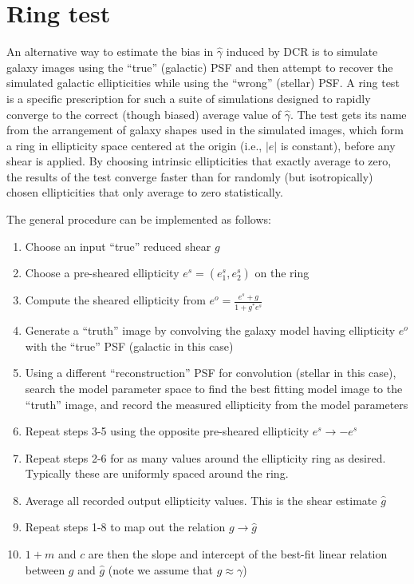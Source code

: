 \documentclass[apj]{emulateapj}
\begin{document}
\section{Ring test}\label{sec:ringtest}
An alternative way to estimate the bias in $\hat{\gamma}$ induced by
DCR is to simulate galaxy images using the ``true'' (galactic) PSF and
then attempt to recover the simulated galactic ellipticities while
using the ``wrong'' (stellar) PSF.  A ring test \citep{Nakajima2007}
is a specific prescription for such a suite of simulations designed to
rapidly converge to the correct (though biased) average value of
$\hat{\gamma}$.  The test gets its name from the arrangement of galaxy
shapes used in the simulated images, which form a ring in ellipticity
space centered at the origin (i.e., $|e|$ is constant), before any
shear is applied.  By choosing intrinsic ellipticities that exactly
average to zero, the results of the test converge faster than for
randomly (but isotropically) chosen ellipticities that only average to
zero statistically.

The general procedure can be implemented as follows:

\begin{enumerate}
  \item Choose an input ``true'' reduced shear $g$
  \item Choose a pre-sheared ellipticity $e^s = (e_1^s, e_2^s)$ on the ring
  \item Compute the sheared ellipticity from $e^o = \frac{e^s+g}{1+g^*e^s}$
  \item Generate a ``truth'' image by convolving the galaxy model
    having ellipticity $e^o$ with the ``true'' PSF (galactic in this
    case)
  \item Using a different ``reconstruction'' PSF for convolution
    (stellar in this case), search the model parameter space to find
    the best fitting model image to the ``truth'' image, and record
    the measured ellipticity from the model parameters
  \item Repeat steps 3-5 using the opposite pre-sheared ellipticity
    $e^s \rightarrow -e^s$
  \item Repeat steps 2-6 for as many values around the ellipticity
    ring as desired.  Typically these are uniformly spaced around the
    ring.
  \item Average all recorded output ellipticity values.  This is the
    shear estimate $\hat{g}$
  \item Repeat steps 1-8 to map out the relation $g \rightarrow
    \hat{g}$
  \item $1+m$ and $c$ are then the slope and intercept of the best-fit
    linear relation between $g$ and $\hat{g}$ (note we assume that $g
    \approx \gamma$)
\end{enumerate}
\end{document}
